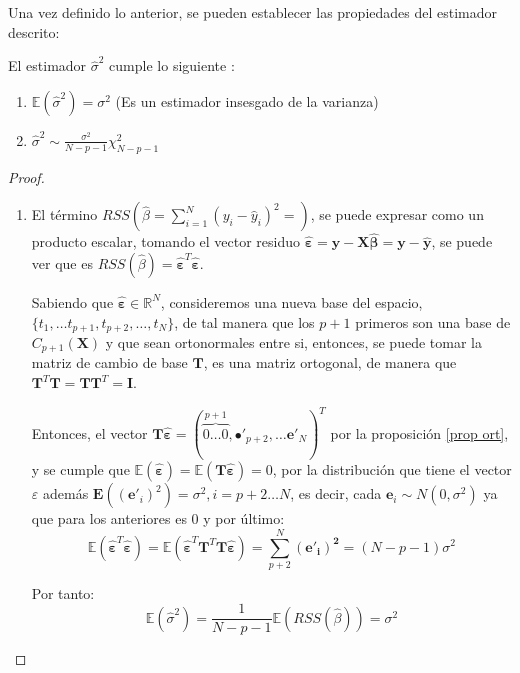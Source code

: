 \noindent Una vez definido lo anterior, se pueden establecer las propiedades del estimador descrito:
\newpage
\begin{propo}
El estimador $\hat{\sigma}^2$ cumple lo siguiente :
\begin{enumerate}
\item $\mathbb{E}(\hat{\sigma} ^2)=\sigma^2$ (Es un estimador insesgado de la varianza)
\item  $\hat{\sigma}^2 \sim \frac{\sigma^2}{N-p-1}\chi_{N-p-1}^2 $
\end{enumerate}
\begin{proof}
\noindent 
\begin{enumerate}
\item El término $RSS(\hat{\beta}=\sum_{i=1}^N (y_i-\hat{y}_i)^2=)$, se puede expresar como un producto escalar, tomando el vector residuo $\hat{\mathbf{\varepsilon}}= \mathbf{y}-\mathbf{X \hat{\beta}}=\mathbf{y}-\mathbf{\hat{y}}$, se puede ver que es $RSS(\hat{\beta})=\hat{\mathbf{\varepsilon}}^T\hat{\mathbf{\varepsilon}}$. 

\noindent Sabiendo que $\mathbf{\hat{\varepsilon}}\in \mathbb{R}^N$, consideremos una nueva base del espacio,\\ $\lbrace t_1,\ldots t_{p+1},t_{p+2},\ldots, t_N \rbrace$, de tal manera que los $p+1$ primeros son una base de $C_{p+1}(\mathbf{X})$ y que sean ortonormales entre si, entonces, se puede tomar la matriz de cambio de base $\mathbf{T}$, es una matriz ortogonal, de manera que 
\\$\mathbf{T}^T\mathbf{T}=\mathbf{TT}^T=\mathbf{I}$. 

\noindent Entonces, el vector $\mathbf{T\hat{\varepsilon}}=(\overbrace{0\ldots 0}^{p+1},\mathbf{•}'_{p+2},\ldots \mathbf{e}'_{N})^T$ por la proposición \ref{prop ort}, y se cumple que $\mathbb{E}(\mathbf{\hat{\varepsilon}})=\mathbb{E}(\mathbf{T\hat{\varepsilon}})=0$, por la distribución que tiene el vector $\varepsilon$ además $\mathbf{E}((\mathbf{e}'_i)^2)=\sigma^2, i=p+2\ldots N $, es decir, cada $\mathbf{e}_i\sim N(0,\sigma^2)$ ya que para los anteriores es 0 y por último: 
\begin{equation}\label{eq:suma-residuos}
\mathbb{E}(\mathbf{\hat{\varepsilon}}^T\mathbf{\hat{\varepsilon}})=\mathbb{E}(\mathbf{\hat{\varepsilon}}^T\mathbf{T}^T\mathbf{T}\mathbf{\hat{\varepsilon}})=\sum_{p+2}^N \mathbf{(e'_i)^2}=(N-p-1) \sigma^2
\end{equation}

\noindent Por tanto:
\begin{equation}
\mathbb{E}(\hat{\sigma}^2)= \dfrac{1}{N-p-1}\mathbb{E}(RSS(\hat{\beta}))=\sigma^2
\end{equation}


\end{enumerate}
\end{proof}
\end{propo}
